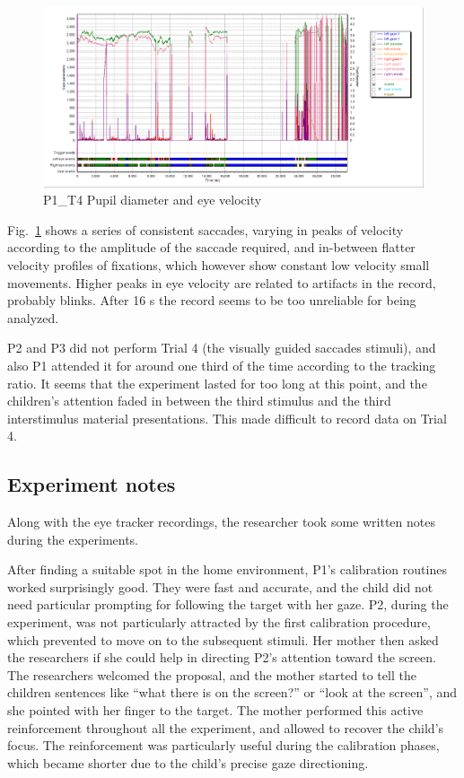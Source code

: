 \begin{figure}[h]
  \centering
  \includegraphics[width=.8\textwidth]{figures/graphs/P1_T4(saccades)_VP.png}
  \caption[P1\_T4 pupil velocity]{P1\_T4 Pupil diameter and eye velocity}
  \label{fig:P1_T4_vel}
\end{figure}

Fig.~\ref{fig:P1_T4_vel} shows a series of consistent saccades, varying in peaks of velocity according to the amplitude of the saccade required, and in-between flatter velocity profiles of fixations, which however show constant low velocity small movements. Higher peaks in eye velocity are related to artifacts in the record, probably blinks. After 16 s the record seems to be too unreliable for being analyzed.

P2 and P3 did not perform Trial 4 (the visually guided saccades stimuli), and also P1 attended it for around one third of the time according to the tracking ratio. It seems that the experiment lasted for too long at this point, and the children’s attention faded in between the third stimulus and the third interstimulus material presentations. This made difficult to record data on Trial 4.

\subsection{Experiment notes}
\label{sec:expnotes}

Along with the eye tracker recordings, the researcher took some written notes during the experiments.

After finding a suitable spot in the home environment, P1’s calibration routines worked surprisingly good. They were fast and accurate, and the child did not need particular prompting for following the target with her gaze.
P2, during the experiment, was not particularly attracted by the first calibration procedure, which prevented to move on to the subsequent stimuli. Her mother then asked the researchers if she could help in directing P2’s attention toward the screen. The researchers welcomed the proposal, and the mother started to tell the children sentences like “what there is on the screen?” or “look at the screen”, and she pointed with her finger to the target. The mother performed this active reinforcement throughout all the experiment, and allowed to recover the child’s focus. The reinforcement was particularly useful during the calibration phases, which became shorter due to the child’s precise gaze directioning.

